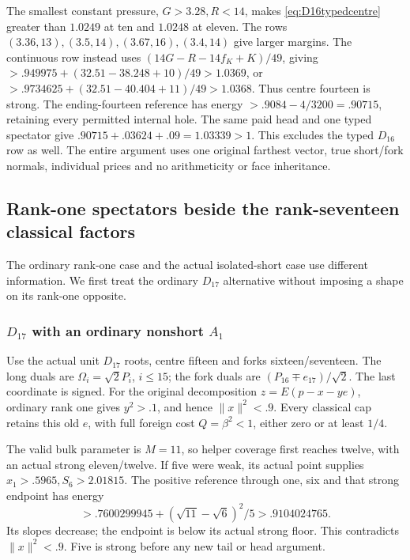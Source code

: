 \documentclass[11pt]{article}
\theoremstyle{definition}
\theoremstyle{remark}
\newcommand{\norm}[1]{\lVert #1\rVert}
\begin{document}
The smallest constant pressure, \(G>3.28,R<14\), makes
\eqref{eq:D16typedcentre} greater than \(1.0249\) at ten and
\(1.0248\) at eleven. The rows \((3.36,13),(3.5,14),
(3.67,16),(3.4,14)\) give larger margins. The continuous row
instead uses \((14G-R-14f_K+K)/49\), giving
\(>.949975+(32.51-38.248+10)/49>1.0369\), or
\(>.9734625+(32.51-40.404+11)/49>1.0368\).
Thus centre fourteen is strong. The ending-fourteen reference has
energy \(>.9084-4/3200=.90715\), retaining every permitted
internal hole. The same paid head and one typed spectator give
\(.90715+.03624+.09=1.03339>1\).
This excludes the typed \(D_{16}\) row as well. The entire
argument uses one original farthest vector, true short/fork normals,
individual prices and no arithmeticity or face inheritance.

\subsection{Rank-one spectators beside the rank-seventeen classical factors}
\label{app:rank17classical18}
The ordinary rank-one case and the actual isolated-short case use
different information. We first treat the ordinary \(D_{17}\)
alternative without imposing a shape on its rank-one opposite.

\subsubsection{\(D_{17}\) with an ordinary nonshort \(A_1\)}
\label{app:D17ordinary18}
Use the actual unit \(D_{17}\) roots, centre fifteen and forks
sixteen/seventeen. The long duals are \(\Omega_i=\sqrt2P_i\),
\(i\le15\); the fork duals are
\((P_{16}\mp e_{17})/\sqrt2\). The last coordinate is signed.
For the original decomposition \(z=E(p-x-ye)\), ordinary rank
one gives \(y^2>.1\), and hence \(\norm x^2<.9\).
Every classical cap retains this old \(e\), with full foreign
cost \(Q=\beta^2<1\), either zero or at least \(1/4\).

The valid bulk parameter is \(M=11\), so helper coverage first
reaches twelve, with an actual strong eleven/twelve. If five were
weak, its actual point supplies \(x_1>.5965,S_6>2.01815\).
The positive reference through one, six and that strong endpoint
has energy
\[
 >.7600299945+(\sqrt{11}-\sqrt6)^2/5>.9104024765.
\]
Its slopes decrease; the endpoint is below its actual strong floor.
This contradicts \(\norm x^2<.9\). Five is strong before any
new tail or head argument.
\end{document}
